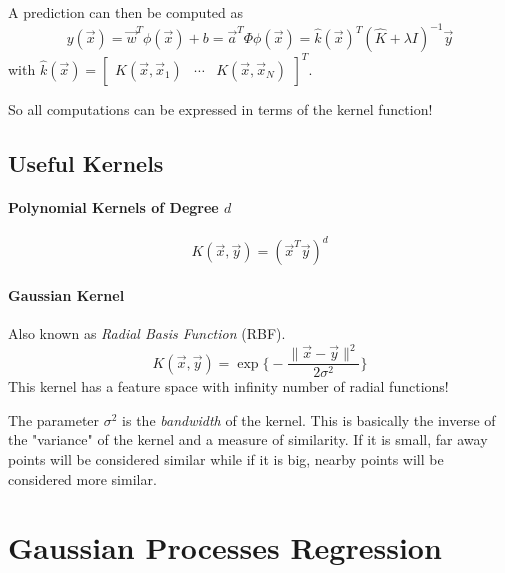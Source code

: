 			A prediction can then be computed as
			\begin{equation}
				y(\vec{x}) = \vec{w}^T \phi(\vec{x}) + b = \vec{a}^T \Phi \phi(\vec{x}) = \hat{k}(\vec{x})^T (\hat{K} + \lambda I)^{-1} \vec{y}
			\end{equation}
			with \( \hat{k}(\vec{x}) = \begin{bmatrix} K(\vec{x}, \vec{x}_1) & \cdots & K(\vec{x}, \vec{x}_N) \end{bmatrix}^T \).
			
			So all computations can be expressed in terms of the kernel function!

		\subsection{Useful Kernels}
			\paragraph{Polynomial Kernels of Degree \(d\)}
				\begin{equation}
					K(\vec{x}, \vec{y}) = (\vec{x}^T \vec{y})^d
				\end{equation}
			
			\paragraph{Gaussian Kernel}
				Also known as \emph{Radial Basis Function} (RBF).
				\begin{equation}
					K(\vec{x}, \vec{y}) = \exp \Bigg\{ -\frac{\lVert \vec{x} - \vec{y} \rVert^2}{2\sigma^2} \Bigg\}
				\end{equation}
				This kernel has a feature space with infinity number of radial functions!
				
				The parameter \( \sigma^2 \) is the \emph{bandwidth} of the kernel. This is basically the inverse of the "variance" of the kernel and a measure of similarity. If it is small, far away points will be considered similar while if it is big, nearby points will be considered more similar.

	\section{Gaussian Processes Regression}
		\label{sec:gaussianProcesses}
	
